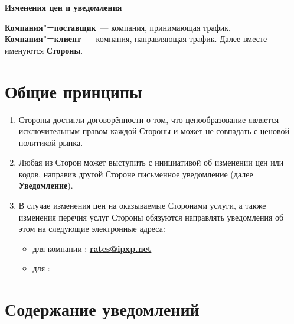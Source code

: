\begin{Form}
  \baselineskip

  \begin{center}
    \textbf{\Large{Изменения цен и уведомления}}
  \end{center}
  
  
  \par\textbf{Компания"=поставщик}~--- компания, принимающая трафик. \textbf{Компания"=клиент}~---
  компания, направляющая трафик. Далее вместе именуются \textbf{Стороны}.

 \section{Общие принципы}\label{anx:a-ru}

     \begin{enumerate}[label=\thesection.\arabic*.]
      \item Стороны достигли договорённости о том, что ценообразование является исключительным правом
        каждой Стороны и может не совпадать с ценовой политикой рынка. 
      \item Любая из Сторон может выступить с инициативой об изменении цен или
        кодов, направив другой Стороне письменное уведомление (далее \textbf{\flqq{}Уведомление\frqq{}}).
      \item В случае изменения цен на оказываемые Сторонами услуги, а также изменения
        перечня услуг Стороны обязуются направлять уведомления об этом на
        следующие электронные адреса: 
      
        \begin{itemize}
          \item для компании \textbf{\ipxpname}: \href{mailto:rates@ipxp.net}{\textbf{rates@ipxp.net}}
          \item для \underline{\TextField[name=clntname,charsize=10pt,width=19em,height=1em,borderwidth=0,bordercolor={1 1 1}]{}}:
              \underline{\TextField[name=clntratesemail,charsize=10pt,width=75mm,height=1em,borderwidth=0,
              bordercolor={1 1 1}]{}}
              \\[\medskipamount]
              \underline{\TextField[name=clntratesemailnext,charsize=10pt,width=151mm,height=1em,borderwidth=0,
              bordercolor={1 1 1}]{}}
        \end{itemize}

      \end{enumerate}
      
\section{Содержание уведомлений}
   

\end{Form}
